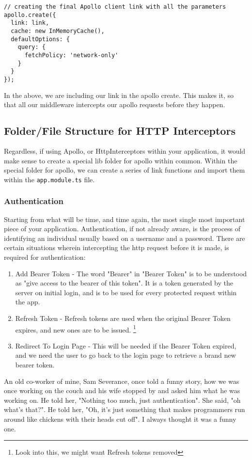\begin{lstlisting}
// creating the final Apollo client link with all the parameters
apollo.create({
  link: link,
  cache: new InMemoryCache(),
  defaultOptions: {
    query: {
      fetchPolicy: 'network-only'
    }
  }
});
\end{lstlisting}

In the above, we are including our link in the apollo create. This makes it, so
that all our middleware intercepts our apollo requests before they happen. 

\subsection{Folder/File Structure for HTTP Interceptors}
Regardless, if using Apollo, or HttpInterceptors within your application, it 
would make sense to create a special lib folder for apollo within common. 
Within the special folder for apollo, we can create a series of link functions
and import them within the \lstinline{app.module.ts} file.

\subsubsection{ Authentication }
Starting from what will be time, and time again, the most single most important
piece of your application. Authentication, if not already aware, is the process 
of identifying an individual usually based on a username and a password. There
are certain situations wherein intercepting the http request before it is made,
is required for authentication:
\begin{enumerate}
\item Add Bearer Token - The word "Bearer" in "Bearer Token" is to be 
understood as "give access to the bearer of this token". It is a token 
generated by the server on initial login, and is to be used for every protected
request within the app. 
\item Refresh Token - Refresh tokens are used when the original Bearer Token
expires, and new ones are to be issued.
\footnote{Look into this, we might want Refresh tokens removed} 
\item Redirect To Login Page - This will be needed if the Bearer Token expired,
and we need the user to go back to the login page to retrieve a brand new 
bearer token. 
\end{enumerate}

An old co-worker of mine, Sam Severance, once told a funny story, how we was
once working on the couch and his wife stopped by and asked him what he was 
working on. He told her, "Nothing too much, just authentication". She said, "oh
what's that?". He told her, "Oh, it's just something that makes programmers run
around like chickens with their heads cut off". I always thought it was a funny
one. 

